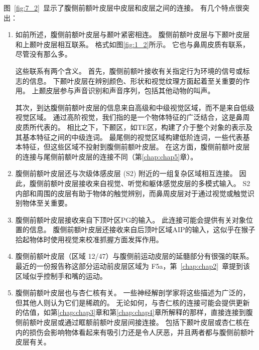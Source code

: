 图~\ref{fig:7_2}~显示了腹侧前额叶皮层中皮层和皮层之间的连接。
有几个特点很突出：
\begin{enumerate}
\item 如前所述，腹侧前额叶皮层与颞叶紧密相连。
腹侧前额叶皮层与下颞叶皮层\cite{ungerleider1989projections,webster1994connections}和上颞叶皮层\cite{seltzer1996overlapping,petrides2002comparative}相互联系。
格式如图\ref{fig:1_2}所示。
它也与鼻周皮质有联系\cite{suzuki1994perirhinal,saleem2008complementary}，尽管没有那么多。 
\par


这些联系有两个含义。
首先，腹侧前额叶接收有关指定行为环境的信号或标志的信息。
下颞叶皮层在辨别颜色、形状和视觉纹理方面起着至关重要的作用\cite{huxlin2000perceptual}。
上颞皮层参与声音识别\cite{tian2001functional}和声音序列\cite{micheyl2005perceptual}，包括其他动物的叫声\cite{rauschecker1995processing}。 
\par


其次，到达腹侧前额叶皮层的信息来自高级和中级视觉区域，而不是来自低级视觉区域。
通过高阶视觉，我们指的是一个物体特征的广泛结合，这是鼻周皮质所代表的\cite{murray2007visual}。
相比之下，下颞区，如TE区，构建了介于整个对象的表示及其基本特征之间的中级连词\cite{murray2007visual}。
最尾侧的视觉区域构建低阶连词，一些代表基本特征，但这些区域不投射到腹侧前额叶皮层\cite{webster1994connections}。
在这方面，腹侧前额叶皮层的连接与尾侧前额叶皮层的连接不同（第\ref{chap:chap5}章）。

\item 腹侧前额叶皮层还与次级体感皮层 (S2) 附近的一组复杂区域相互连接\cite{petrides2002comparative}。
因此，腹侧前额叶皮层接收来自视觉、听觉和躯体感觉皮层的多模式输入。
S2内部和周围的皮层有助于物体的触觉辨别\cite{mishkin1979analogous}，而鼻周皮层对于通过视觉或触觉识别物体至关重要\cite{goulet2001neural,murray2007visual}。

\item 腹侧前额叶皮层接收来自下顶叶区PG的输入\cite{petrides2002comparative}。
此连接可能会提供有关对象位置的信息。
腹侧前额叶皮层还接收来自后顶叶区域AIP的输入，这似乎在猴子拾起物体时使用视觉来校准抓握方面发挥作用\cite{fogassi2001cortical}。

\item 腹侧前额叶皮层（区域 12/47）与腹侧前运动皮层的延髓部分有很强的联系。 
最近的一份报告称这部分运动前皮层区域为 F5a\cite{gerbella2011cortical}，第~\ref{chap:chap2}~章提到该区域似乎控制手和嘴的运动。 

\item 腹侧前额叶皮层也与杏仁核有关。
一些神经解剖学家将这些描述为广泛的\cite{amaral1984amygdalo,stefanacci2002some}，但其他人则认为它们是稀疏的\cite{carmichael1995limbic,price2010neurocircuitry}。
无论如何，与杏仁核的连接可能会提供更新的估值，如第\ref{chap:chap3}章和第\ref{chap:chap4}章所解释的那样，直接连接到腹侧前额叶皮层或通过眶额前额叶皮层间接连接。
包括下颞叶皮层\cite{horel1975partial}或杏仁核\cite{horel1975partial}在内的损伤会影响物体看起来有吸引力还是令人厌恶，并且两者都与腹侧前额叶皮层有关。
\end{enumerate}



